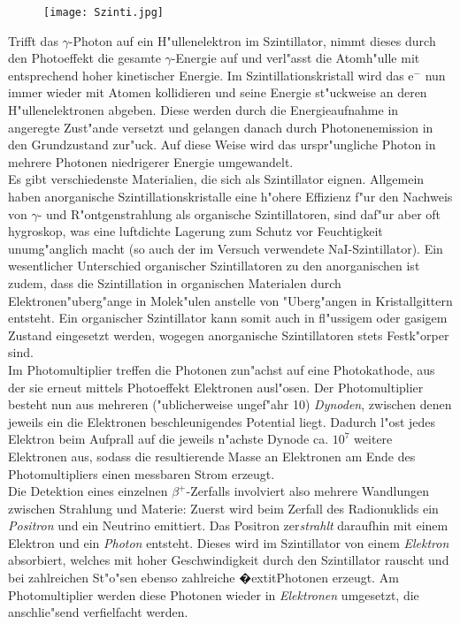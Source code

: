 \documentclass{article}
\begin{document}
\begin{figure}[H]
	\centering
	\texttt{[image: Szinti.jpg]}
	\label{figSzinti}
\end{figure}

Trifft das $\gamma$-Photon auf ein H"ullenelektron im Szintillator, nimmt dieses durch den Photoeffekt die gesamte $\gamma$-Energie auf und verl"asst die Atomh"ulle mit entsprechend hoher kinetischer Energie. Im Szintillationskristall wird das e$^-$ nun immer wieder mit Atomen kollidieren und seine Energie st"uckweise an deren H"ullenelektronen abgeben. Diese werden durch die Energieaufnahme in angeregte Zust"ande versetzt und gelangen danach durch Photonenemission in den Grundzustand zur"uck. Auf diese Weise wird das urspr"ungliche Photon in mehrere Photonen niedrigerer Energie umgewandelt.\\
Es gibt verschiedenste Materialien, die sich als Szintillator eignen. Allgemein haben anorganische Szintillationskristalle eine h"ohere Effizienz f"ur den Nachweis von $\gamma$- und R"ontgenstrahlung als organische Szintillatoren, sind daf"ur aber oft hygroskop, was eine luftdichte Lagerung zum Schutz vor Feuchtigkeit unumg"anglich macht (so auch der im Versuch verwendete NaI-Szintillator). Ein wesentlicher Unterschied organischer Szintillatoren zu den anorganischen ist zudem, dass die Szintillation in organischen Materialen durch Elektronen"uberg"ange in Molek"ulen anstelle von "Uberg"angen in Kristallgittern entsteht. Ein organischer Szintillator kann somit auch in fl"ussigem oder gasigem Zustand eingesetzt werden, wogegen anorganische Szintillatoren stets Festk"orper sind.\\
Im Photomultiplier treffen die Photonen zun"achst auf eine Photokathode, aus der sie erneut mittels Photoeffekt Elektronen ausl"osen.
Der Photomultiplier besteht nun aus mehreren ("ublicherweise ungef"ahr 10) \textit{Dynoden}, zwischen denen jeweils ein die Elektronen beschleunigendes Potential liegt. Dadurch l"ost jedes Elektron beim Aufprall auf die jeweils n"achste Dynode ca. $10^7$ weitere Elektronen aus, sodass die resultierende Masse an Elektronen am Ende des Photomultipliers einen messbaren Strom erzeugt.\\
Die Detektion eines einzelnen $\beta^+$-Zerfalls involviert also mehrere Wandlungen zwischen Strahlung und Materie: Zuerst wird beim Zerfall des Radionuklids ein \textit{Positron} und ein Neutrino emittiert. Das Positron zer\textit{strahlt} daraufhin mit einem Elektron und ein \textit{Photon} entsteht. Dieses wird im Szintillator von einem \textit{Elektron} absorbiert, welches mit hoher Geschwindigkeit durch den Szintillator rauscht und bei zahlreichen St"o"sen ebenso zahlreiche �extit{Photonen} erzeugt. Am Photomultiplier werden diese Photonen wieder in \textit{Elektronen} umgesetzt, die anschlie"send verfielfacht werden.
\end{document}

